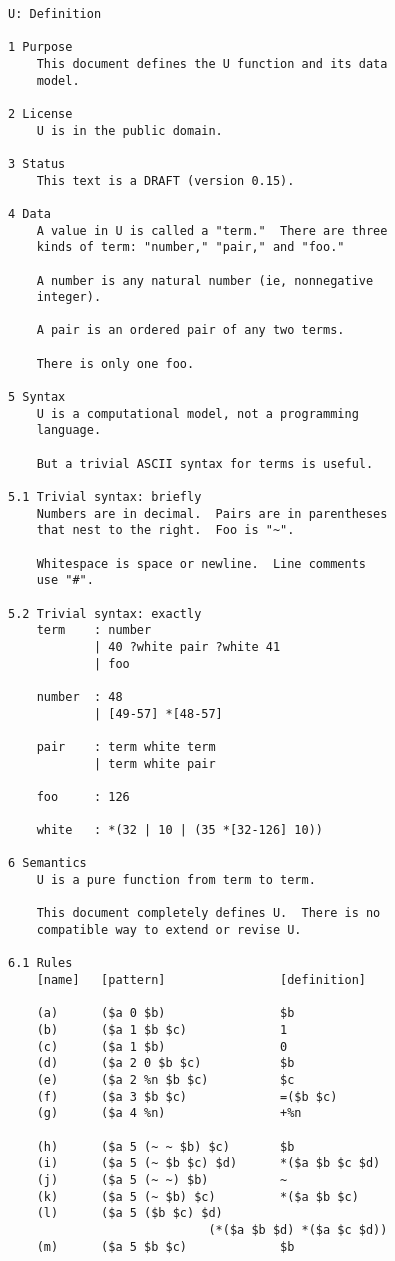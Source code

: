 \documentclass[twoside]{article}
\begin{document}
\begin{lstlisting}[label=lst:u,caption={\texttt{U}, 31 January 2006.  The earliest extant patriarch of the Nock family.},style=listingcode]
U: Definition

1 Purpose
    This document defines the U function and its data
    model.

2 License
    U is in the public domain.

3 Status
    This text is a DRAFT (version 0.15).

4 Data
    A value in U is called a "term."  There are three
    kinds of term: "number," "pair," and "foo."

    A number is any natural number (ie, nonnegative
    integer).

    A pair is an ordered pair of any two terms.

    There is only one foo.

5 Syntax
    U is a computational model, not a programming
    language.

    But a trivial ASCII syntax for terms is useful.

5.1 Trivial syntax: briefly
    Numbers are in decimal.  Pairs are in parentheses
    that nest to the right.  Foo is "~".

    Whitespace is space or newline.  Line comments
    use "#".

5.2 Trivial syntax: exactly
    term    : number
            | 40 ?white pair ?white 41
            | foo

    number  : 48
            | [49-57] *[48-57]

    pair    : term white term
            | term white pair

    foo     : 126

    white   : *(32 | 10 | (35 *[32-126] 10))

6 Semantics
    U is a pure function from term to term.

    This document completely defines U.  There is no
    compatible way to extend or revise U.

6.1 Rules
    [name]   [pattern]                [definition]

    (a)      ($a 0 $b)                $b
    (b)      ($a 1 $b $c)             1
    (c)      ($a 1 $b)                0
    (d)      ($a 2 0 $b $c)           $b
    (e)      ($a 2 %n $b $c)          $c
    (f)      ($a 3 $b $c)             =($b $c)
    (g)      ($a 4 %n)                +%n

    (h)      ($a 5 (~ ~ $b) $c)       $b
    (i)      ($a 5 (~ $b $c) $d)      *($a $b $c $d)
    (j)      ($a 5 (~ ~) $b)          ~
    (k)      ($a 5 (~ $b) $c)         *($a $b $c)
    (l)      ($a 5 ($b $c) $d)
                            (*($a $b $d) *($a $c $d))
    (m)      ($a 5 $b $c)             $b


\end{lstlisting}
\end{document}
